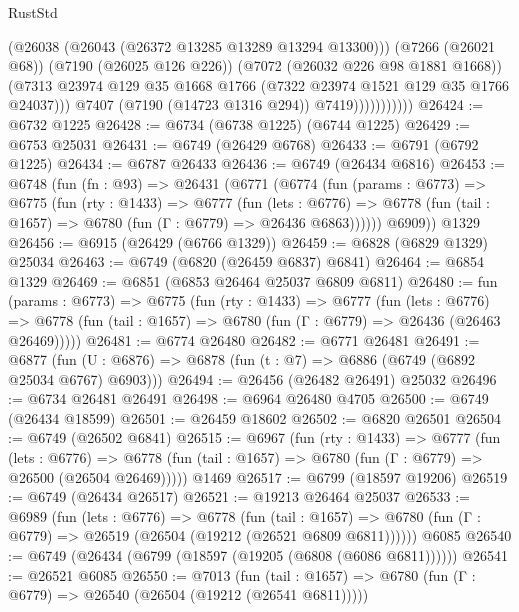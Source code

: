 \begin{lexlean}{RustStd}
\begin{coremodule}
                            (@26038 (@26043 (@26372 @13285 @13289 @13294 @13300)))
                            (@7266 (@26021 @68))
                            (@7190 (@26025 @126 @226))
                            (@7072 (@26032 @226 @98 @1881 @1668))
                            (@7313
                              @23974
                              @129
                              @35
                              @1668
                              @1766
                              (@7322 @23974 @1521 @129 @35 @1766 @24037)))
                          @7407
                          (@7190 (@14723 @1316 @294))
                          @7419)))))))))))
@26424 := @6732 @1225
@26428 := @6734 (@6738 @1225) (@6744 @1225)
@26429 := @6753 @25031
@26431 := @6749 (@26429 @6768)
@26433 := @6791 (@6792 @1225)
@26434 := @6787 @26433
@26436 := @6749 (@26434 @6816)
@26453 := @6748
    (fun (fn : @93) =>
    @26431
      (@6771
        (@6774
          (fun (params : @6773) =>
          @6775
            (fun (rty : @1433) =>
            @6777
              (fun (lets : @6776) =>
              @6778 (fun (tail : @1657) => @6780 (fun (Γ : @6779) => @26436 @6863))))))
        @6909))
    @1329
@26456 := @6915 (@26429 (@6766 @1329))
@26459 := @6828 (@6829 @1329) @25034
@26463 := @6749 (@6820 (@26459 @6837) @6841)
@26464 := @6854 @1329
@26469 := @6851 (@6853 @26464 @25037 @6809 @6811)
@26480 := fun (params : @6773) =>
  @6775
    (fun (rty : @1433) =>
    @6777
      (fun (lets : @6776) =>
      @6778 (fun (tail : @1657) => @6780 (fun (Γ : @6779) => @26436 (@26463 @26469)))))
@26481 := @6774 @26480
@26482 := @6771 @26481
@26491 := @6877
    (fun (U : @6876) => @6878 (fun (t : @7) => @6886 (@6749 (@6892 @25034 @6767) @6903)))
@26494 := @26456 (@26482 @26491) @25032
@26496 := @6734 @26481 @26491
@26498 := @6964 @26480 @4705
@26500 := @6749 (@26434 @18599)
@26501 := @26459 @18602
@26502 := @6820 @26501
@26504 := @6749 (@26502 @6841)
@26515 := @6967
    (fun (rty : @1433) =>
    @6777
      (fun (lets : @6776) =>
      @6778 (fun (tail : @1657) => @6780 (fun (Γ : @6779) => @26500 (@26504 @26469)))))
    @1469
@26517 := @6799 (@18597 @19206)
@26519 := @6749 (@26434 @26517)
@26521 := @19213 @26464 @25037
@26533 := @6989
    (fun (lets : @6776) =>
    @6778
      (fun (tail : @1657) =>
      @6780 (fun (Γ : @6779) => @26519 (@26504 (@19212 (@26521 @6809 @6811))))))
    @6085
@26540 := @6749 (@26434 (@6799 (@18597 (@19205 (@6808 (@6086 @6811))))))
@26541 := @26521 @6085
@26550 := @7013
    (fun (tail : @1657) => @6780 (fun (Γ : @6779) => @26540 (@26504 (@19212 (@26541 @6811)))))

\end{coremodule}
\end{lexlean}
